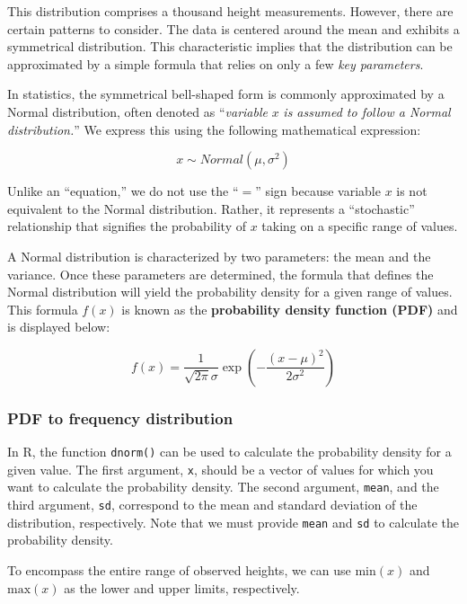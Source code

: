 \documentclass[
]{article}
\begin{document}
This distribution comprises a thousand height measurements. However, there are certain patterns to consider. The data is centered around the mean and exhibits a symmetrical distribution. This characteristic implies that the distribution can be approximated by a simple formula that relies on only a few \emph{key parameters}.

In statistics, the symmetrical bell-shaped form is commonly approximated by a Normal distribution, often denoted as ``\emph{variable} \(x\) \emph{is assumed to follow a Normal distribution.}'' We express this using the following mathematical expression:

\[
x \sim Normal(\mu, \sigma^2)
\]

Unlike an ``equation,'' we do not use the ``\(=\)'' sign because variable \(x\) is not equivalent to the Normal distribution. Rather, it represents a ``stochastic'' relationship that signifies the probability of \(x\) taking on a specific range of values.

A Normal distribution is characterized by two parameters: the mean and the variance. Once these parameters are determined, the formula that defines the Normal distribution will yield the probability density for a given range of values. This formula \(f(x)\) is known as the \textbf{probability density function (PDF)} and is displayed below:

\[
f(x) = \frac{1}{\sqrt{2 \pi} \sigma} \exp\left(-\frac{(x-\mu)^2}{2\sigma^2}\right)
\]

\hypertarget{pdf-to-frequency-distribution}{%
\subsubsection{PDF to frequency distribution}\label{pdf-to-frequency-distribution}}

In R, the function \texttt{dnorm()} can be used to calculate the probability density for a given value. The first argument, \texttt{x}, should be a vector of values for which you want to calculate the probability density. The second argument, \texttt{mean}, and the third argument, \texttt{sd}, correspond to the mean and standard deviation of the distribution, respectively. Note that we must provide \texttt{mean} and \texttt{sd} to calculate the probability density.

To encompass the entire range of observed heights, we can use \(\text{min}(x)\) and \(\text{max}(x)\) as the lower and upper limits, respectively.
\end{document}
